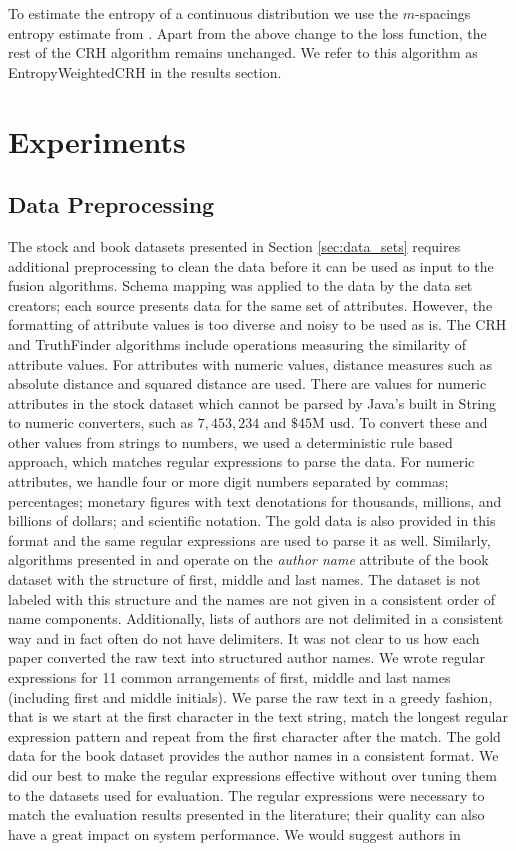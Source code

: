 \documentclass{acm_proc_article-sp}
\begin{document}
To estimate the entropy of a continuous distribution we use the $m$-spacings entropy estimate from \cite{learned2003ica}. Apart from the above change to the loss function, the rest of the CRH algorithm remains unchanged. We refer to this algorithm as {\sc EntropyWeightedCRH} in the results section. 

\section{Experiments}

\subsection{Data Preprocessing}

The stock and book datasets presented in Section \ref{sec:data_sets} requires additional preprocessing to clean the data before it can be used as input to the fusion algorithms. Schema mapping was applied to the data by the data set creators; each source presents data for the same set of attributes. However, the formatting of attribute values is too diverse and noisy to be used as is.  The {\sc CRH} and {\sc TruthFinder} algorithms include operations measuring the similarity of attribute values. For attributes with numeric values, distance measures such as absolute distance and squared distance are used.  There are values for numeric attributes in the stock dataset which cannot be parsed by Java's built in String to numeric converters, such as $7,453,234$ and $\$45\text{M usd}$. To convert these and other values from strings to numbers, we used a deterministic rule based approach, which matches regular expressions to parse the data. For numeric attributes, we handle four or more digit numbers separated by commas; percentages; monetary figures with text denotations for thousands, millions, and billions of dollars; and scientific notation. The gold data is also provided in this format and the same regular expressions are used to parse it as well. Similarly, algorithms presented in \cite{dong:integrating} and \cite{yin:truth} operate on the \emph{author name} attribute of the book dataset with the structure of first, middle and last names. The dataset is not labeled with this structure and the names are not given in a consistent order of name components. Additionally, lists of authors are not delimited in a consistent way and in fact often do not have delimiters. It was not clear to us how each paper converted the raw text into structured author names. We wrote regular expressions for  11 common arrangements of first, middle and last names (including first and middle initials). We parse the raw text in a greedy fashion, that is we start at the first character in the text string, match the longest regular expression pattern and repeat from the first character after the match. The gold data for the book dataset provides the author names in a consistent format. We did our best to make the regular expressions effective without over tuning them to the datasets used for evaluation. The regular expressions were necessary to match the evaluation results presented in the literature; their quality can also have a great impact on system performance. We would suggest authors in 
\end{document}
